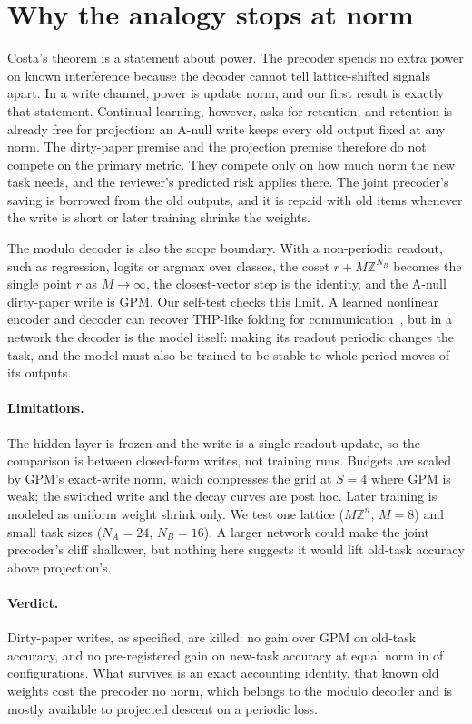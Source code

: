 \section{Why the analogy stops at norm}
\label{sec:scope}

Costa's theorem is a statement about power.
The precoder spends no extra power on known interference because the decoder cannot tell lattice-shifted signals apart.
In a write channel, power is update norm, and our first result is exactly that statement.
Continual learning, however, asks for retention, and retention is already free for projection: an A-null write keeps every old output fixed at any norm.
The dirty-paper premise and the projection premise therefore do not compete on the primary metric.
They compete only on how much norm the new task needs, and the reviewer's predicted risk applies there.
The joint precoder's saving is borrowed from the old outputs, and it is repaid with old items whenever the write is short or later training shrinks the weights.

The modulo decoder is also the scope boundary.
With a non-periodic readout, such as regression, logits or argmax over classes, the coset \(r+M\mathbb Z^{N_B}\) becomes the single point \(r\) as \(M\to\infty\), the closest-vector step is the identity, and the A-null dirty-paper write is GPM.
Our self-test checks this limit.
A learned nonlinear encoder and decoder can recover THP-like folding for communication~\citep{ozyilkan2025dirty}, but in a network the decoder is the model itself: making its readout periodic changes the task, and the model must also be trained to be stable to whole-period moves of its outputs.

\paragraph{Limitations.}
The hidden layer is frozen and the write is a single readout update, so the comparison is between closed-form writes, not training runs.
Budgets are scaled by GPM's exact-write norm, which compresses the grid at \(S=4\) where GPM is weak; the switched write and the decay curves are post hoc.
Later training is modeled as uniform weight shrink only.
We test one lattice (\(M\mathbb Z^n\), \(M=8\)) and small task sizes (\(N_A=24\), \(N_B=16\)).
A larger network could make the joint precoder's cliff shallower, but nothing here suggests it would lift old-task accuracy above projection's.

\paragraph{Verdict.}
Dirty-paper writes, as specified, are killed: no gain over GPM on old-task accuracy, and no pre-registered gain on new-task accuracy at equal norm in \nkilled{} of \nconfigs{} configurations.
What survives is an exact accounting identity, that known old weights cost the precoder no norm, which belongs to the modulo decoder and is mostly available to projected descent on a periodic loss.
